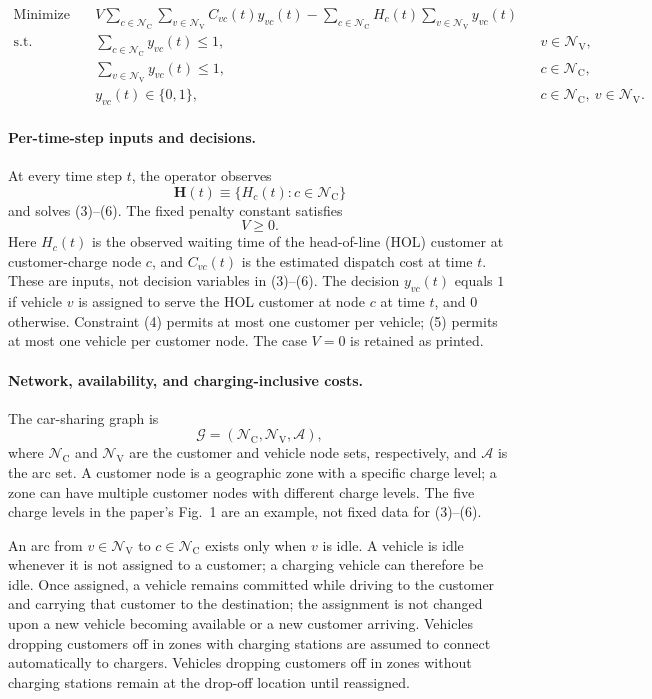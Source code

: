 \documentclass{article}
\begin{document}
\begin{align}
\text{Minimize}\quad &V\sum_{c\in\mathcal N_{\mathrm C}}\sum_{v\in\mathcal N_{\mathrm V}} C_{vc}(t)y_{vc}(t)
-\sum_{c\in\mathcal N_{\mathrm C}}H_c(t)\sum_{v\in\mathcal N_{\mathrm V}}y_{vc}(t) \tag{3}\\
\text{s.t.}\quad &\sum_{c\in\mathcal N_{\mathrm C}}y_{vc}(t)\leq 1,
&&v\in\mathcal N_{\mathrm V}, \tag{4}\\
&\sum_{v\in\mathcal N_{\mathrm V}}y_{vc}(t)\leq 1,
&&c\in\mathcal N_{\mathrm C}, \tag{5}\\
&y_{vc}(t)\in\{0,1\},
&&c\in\mathcal N_{\mathrm C},\ v\in\mathcal N_{\mathrm V}. \tag{6}
\end{align}

\paragraph{Per-time-step inputs and decisions.}
At every time step $t$, the operator observes
\[
\mathbf H(t)\equiv\{H_c(t):c\in\mathcal N_{\mathrm C}\}
\]
and solves (3)--(6). The fixed penalty constant satisfies
\[
V\geq 0.
\]
Here $H_c(t)$ is the observed waiting time of the head-of-line (HOL) customer at customer-charge node $c$, and $C_{vc}(t)$ is the estimated dispatch cost at time $t$. These are inputs, not decision variables in (3)--(6). The decision $y_{vc}(t)$ equals $1$ if vehicle $v$ is assigned to serve the HOL customer at node $c$ at time $t$, and $0$ otherwise. Constraint (4) permits at most one customer per vehicle; (5) permits at most one vehicle per customer node. The case $V=0$ is retained as printed.

\paragraph{Network, availability, and charging-inclusive costs.}
The car-sharing graph is
\[
\mathcal G=(\mathcal N_{\mathrm C},\mathcal N_{\mathrm V},\mathcal A),
\]
where $\mathcal N_{\mathrm C}$ and $\mathcal N_{\mathrm V}$ are the customer and vehicle node sets, respectively, and $\mathcal A$ is the arc set. A customer node is a geographic zone with a specific charge level; a zone can have multiple customer nodes with different charge levels. The five charge levels in the paper's Fig.~1 are an example, not fixed data for (3)--(6).

An arc from $v\in\mathcal N_{\mathrm V}$ to $c\in\mathcal N_{\mathrm C}$ exists only when $v$ is idle. A vehicle is idle whenever it is not assigned to a customer; a charging vehicle can therefore be idle. Once assigned, a vehicle remains committed while driving to the customer and carrying that customer to the destination; the assignment is not changed upon a new vehicle becoming available or a new customer arriving. Vehicles dropping customers off in zones with charging stations are assumed to connect automatically to chargers. Vehicles dropping customers off in zones without charging stations remain at the drop-off location until reassigned.
\end{document}
